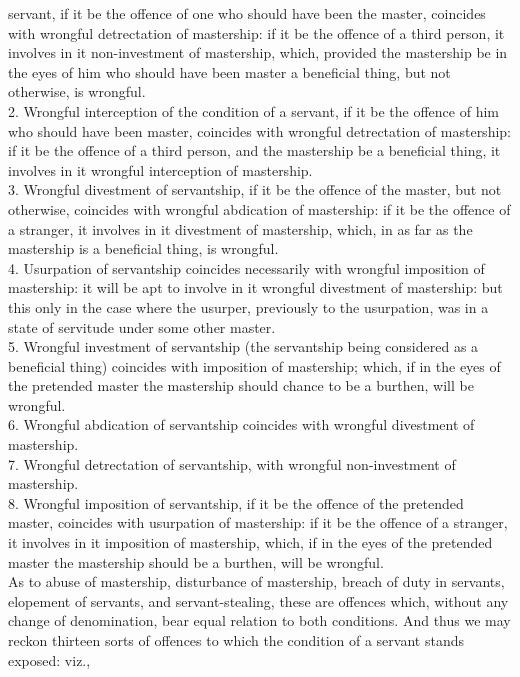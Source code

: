 \documentclass[12pt]{report}
\begin{document}
servant, if it be the offence of one who should have been the master,
coincides with wrongful detrectation of mastership: if it be the offence
of a third person, it involves in it non-investment of mastership,
which, provided the mastership be in the eyes of him who should have
been master a beneficial thing, but not otherwise, is wrongful.\\
2. Wrongful interception of the condition of a servant, if it be the
offence of him who should have been master, coincides with wrongful
detrectation of mastership: if it be the offence of a third person, and
the mastership be a beneficial thing, it involves in it wrongful
interception of mastership.\\
3. Wrongful divestment of servantship, if it be the offence of the
master, but not otherwise, coincides with wrongful abdication of
mastership: if it be the offence of a stranger, it involves in it
divestment of mastership, which, in as far as the mastership is a
beneficial thing, is wrongful.\\
4. Usurpation of servantship coincides necessarily with wrongful
imposition of mastership: it will be apt to involve in it wrongful
divestment of mastership: but this only in the case where the usurper,
previously to the usurpation, was in a state of servitude under some
other master.\\
5. Wrongful investment of servantship (the servantship being considered
as a beneficial thing) coincides with imposition of mastership; which,
if in the eyes of the pretended master the mastership should chance to
be a burthen, will be wrongful.\\
6. Wrongful abdication of servantship coincides with wrongful divestment
of mastership.\\
7. Wrongful detrectation of servantship, with wrongful non-investment of
mastership.\\
8. Wrongful imposition of servantship, if it be the offence of the
pretended master, coincides with usurpation of mastership: if it be the
offence of a stranger, it involves in it imposition of mastership,
which, if in the eyes of the pretended master the mastership should be a
burthen, will be wrongful.\\
As to abuse of mastership, disturbance of mastership, breach of duty in
servants, elopement of servants, and servant-stealing, these are
offences which, without any change of denomination, bear equal relation
to both conditions. And thus we may reckon thirteen sorts of offences to
which the condition of a servant stands exposed: viz.,\\
\end{document}
